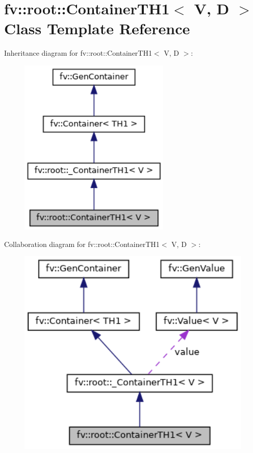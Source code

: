\hypertarget{classfv_1_1root_1_1ContainerTH1}{}\section{fv\+:\+:root\+:\+:Container\+T\+H1$<$ V, D $>$ Class Template Reference}
\label{classfv_1_1root_1_1ContainerTH1}


Inheritance diagram for fv\+:\+:root\+:\+:Container\+T\+H1$<$ V, D $>$\+:
\nopagebreak
\begin{figure}[H]
\begin{center}
\leavevmode
\includegraphics[width=204pt]{classfv_1_1root_1_1ContainerTH1__inherit__graph}
\end{center}
\end{figure}


Collaboration diagram for fv\+:\+:root\+:\+:Container\+T\+H1$<$ V, D $>$\+:
\nopagebreak
\begin{figure}[H]
\begin{center}
\leavevmode
\includegraphics[width=350pt]{classfv_1_1root_1_1ContainerTH1__coll__graph}
\end{center}
\end{figure}
